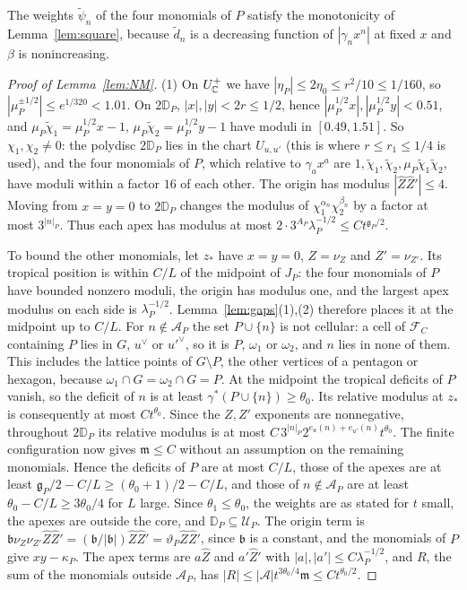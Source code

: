 The weights $\tilde\psi_n$ of the four monomials of $P$ satisfy the monotonicity of Lemma~\ref{lem:square}, because
$\tilde d_n$ is a decreasing function of $|\gamma_nx^n|$ at fixed $x$ and $\beta$ is nonincreasing.

\begin{proof}[Proof of Lemma~\ref{lem:NM}]
(1) On $U^+_\mathbb C$ we have $|\eta_P|\le2\eta_0\le r^2/10\le1/160$, so $|\mu_P^{\pm1/2}|\le e^{1/320}<1.01$. On $2\mathbb D_P$,
$|x|,|y|<2r\le1/2$, hence $|\mu_P^{1/2}x|,|\mu_P^{1/2}y|<0.51$, and $\mu_P\tilde\chi_1=\mu_P^{1/2}x-1$,
$\mu_P\tilde\chi_2=\mu_P^{1/2}y-1$ have moduli in $[0.49,1.51]$. So $\chi_1,\chi_2\neq0$: the polydisc $2\mathbb D_P$ lies in
the chart $U_{u,u'}$ (this is where $r\le r_1\le1/4$ is used), and the four monomials of $P$, which relative to
$\gamma_ax^a$ are $1,\tilde\chi_1,\tilde\chi_2,\mu_P\tilde\chi_1\tilde\chi_2$, have moduli within a factor $16$ of each other.
The origin has modulus $|\hat Z\hat Z'|\le4$. Moving from $x=y=0$ to $2\mathbb D_P$ changes the modulus of
$\chi_1^{\alpha_n}\chi_2^{\beta_n}$ by a factor at most $3^{|n|_P}$. Thus each apex has modulus at most
$2\cdot3^{A_P}\lambda_P^{-1/2}\le Ct^{\mathfrak g_P/2}$.

To bound the other monomials, let $z_*$ have $x=y=0$, $Z=\nu_Z$ and $Z'=\nu_{Z'}$. Its tropical position is within
$C/L$ of the midpoint of $J_P$: the four monomials of $P$ have bounded nonzero moduli, the origin has modulus one,
and the largest apex modulus on each side is $\lambda_P^{-1/2}$. Lemma~\ref{lem:gaps}(1),(2) therefore places it at
the midpoint up to $C/L$. For $n\notin\mathcal A_P$ the set $P\cup\{n\}$ is not cellular: a cell of $\mathcal F_C$ containing
$P$ lies in $G$, $u^\vee$ or $u'^\vee$, so it is $P$, $\omega_1$ or $\omega_2$, and $n$ lies in none of them. This includes
the lattice points of $G\setminus P$, the other vertices of a pentagon or hexagon, because
$\omega_1\cap G=\omega_2\cap G=P$. At the midpoint the tropical deficits of $P$ vanish, so the deficit of $n$ is at
least $\gamma^*(P\cup\{n\})\ge\theta_0$. Its relative modulus at $z_*$ is consequently at most $Ct^{\theta_0}$.
Since the $Z,Z'$ exponents are nonnegative, throughout $2\mathbb D_P$ its relative modulus is at most
$C\,3^{|n|_P}2^{e_u(n)+e_{u'}(n)}t^{\theta_0}$. The finite configuration now gives $\mathfrak m\le C$ without an
assumption on the remaining monomials. Hence the deficits of $P$ are at most $C/L$, those of the apexes are at least
$\mathfrak g_P/2-C/L\ge(\theta_0+1)/2-C/L$, and those of $n\notin\mathcal A_P$ are at least
$\theta_0-C/L\ge3\theta_0/4$ for $L$ large. Since $\theta_1\le\theta_0$, the
weights are as stated for $t$ small, the apexes are outside the core, and $\mathbb D_P\subseteq\mathcal U_P$. The origin term
is $\mathfrak b\nu_Z\nu_{Z'}\hat Z\hat Z'=(\mathfrak b/|\mathfrak b|)\hat Z\hat Z'=\vartheta_P\hat Z\hat Z'$, since $\mathfrak b$ is a
constant, and the monomials of $P$ give $xy-\kappa_P$. The apex terms are $a\hat Z$ and $a'\hat Z'$ with
$|a|,|a'|\le C\lambda_P^{-1/2}$, and $R$, the sum of the monomials outside $\mathcal A_P$, has
$|R|\le|\mathcal A|t^{3\theta_0/4}\mathfrak m\le Ct^{\theta_0/2}$.


\end{proof}
